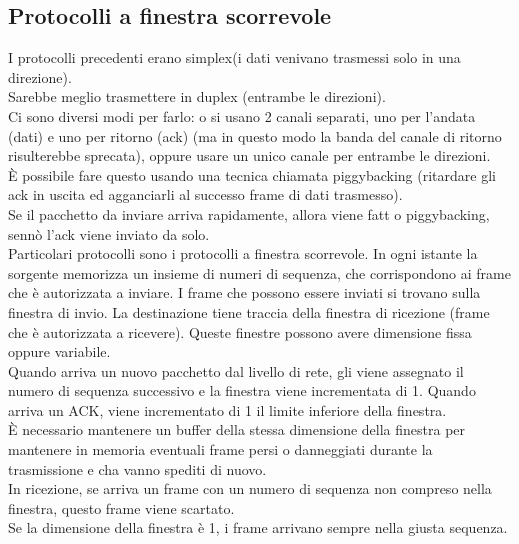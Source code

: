 \documentclass{article}
\begin{document}
\subsection{Protocolli a finestra scorrevole}
I protocolli precedenti erano simplex(i dati venivano trasmessi solo in una direzione). \\
Sarebbe meglio trasmettere in duplex (entrambe le direzioni).\\
Ci sono diversi modi per farlo: o si usano 2 canali separati, uno per l'andata (dati) e uno per ritorno (ack) (ma in questo modo la banda del canale di ritorno risulterebbe sprecata), oppure usare un unico canale per entrambe le direzioni. \\
È possibile fare questo usando una tecnica chiamata piggybacking (ritardare gli ack in uscita ed agganciarli al successo frame di dati trasmesso). \\
Se il pacchetto da inviare arriva rapidamente, allora viene fatt o piggybacking, sennò l'ack viene inviato da solo. \\
Particolari protocolli sono i protocolli a finestra scorrevole. In ogni istante la sorgente memorizza un insieme di numeri di sequenza, che corrispondono ai frame che è autorizzata a inviare. I frame che possono essere inviati si trovano sulla finestra di invio. La destinazione tiene traccia della finestra di ricezione (frame che è autorizzata a ricevere). Queste finestre possono avere dimensione fissa oppure variabile. \\
Quando arriva un nuovo pacchetto dal livello di rete, gli viene assegnato il numero di sequenza successivo e la finestra viene incrementata di 1. Quando arriva un ACK, viene incrementato di 1 il limite inferiore della finestra. \\
È necessario mantenere un buffer della stessa dimensione della finestra per mantenere in memoria eventuali frame persi o danneggiati durante la trasmissione e cha vanno spediti di nuovo. \\
In ricezione, se arriva un frame con un numero di sequenza non compreso nella finestra, questo frame viene scartato. \\
Se la dimensione della finestra è 1, i frame arrivano sempre nella giusta sequenza. \\
\end{document}
